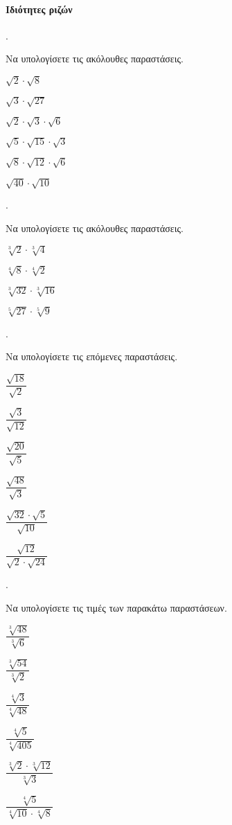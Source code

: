 \documentclass[11pt,a4paper,twocolumn]{article}
\newcounter{askhsh}
\newcommand{\askhsh}{\large\theaskhsh.\ \addtocounter{askhsh}{1}}
\begin{document}
\paragraph{Ιδιότητες ριζών}
\askhsh Να υπολογίσετε τις ακόλουθες παραστάσεις.
\begin{multicols}{2}
\begin{alist}
\item $\sqrt{2}\cdot\sqrt{8}$
\item $\sqrt{3}\cdot\sqrt{27}$
\item $\sqrt{2}\cdot\sqrt{3}\cdot\sqrt{6}$
\item $\sqrt{5}\cdot\sqrt{15}\cdot\sqrt{3}$
\item $\sqrt{8}\cdot\sqrt{12}\cdot\sqrt{6}$
\item $\sqrt{40}\cdot\sqrt{10}$
\end{alist}
\end{multicols}
\askhsh Να υπολογίσετε τις ακόλουθες παραστάσεις.
\begin{multicols}{2}
\begin{alist}
\item $\sqrt[3]{2}\cdot\sqrt[3]{4}$
\item $\sqrt[4]{8}\cdot\sqrt[4]{2}$
\item $\sqrt[3]{32}\cdot\sqrt[3]{16}$
\item $\sqrt[5]{27}\cdot\sqrt[5]{9}$
\end{alist}
\end{multicols}
\askhsh Να υπολογίσετε τις επόμενες παραστάσεις.
\begin{multicols}{3}
\begin{alist}
\item $\dfrac{\sqrt{18}}{\sqrt{2}}$
\item $\dfrac{\sqrt{3}}{\sqrt{12}}$
\item $\dfrac{\sqrt{20}}{\sqrt{5}}$
\item $\dfrac{\sqrt{48}}{\sqrt{3}}$
\item $\dfrac{\sqrt{32}\cdot\sqrt{5}}{\sqrt{10}}$
\item $\dfrac{\sqrt{12}}{\sqrt{2}\cdot\sqrt{24}}$
\end{alist}
\end{multicols}
\askhsh Να υπολογίσετε τις τιμές των παρακάτω παραστάσεων.
\begin{multicols}{3}
\begin{alist}
\item $\dfrac{\sqrt[3]{48}}{\sqrt[3]{6}}$
\item $\dfrac{\sqrt[3]{54}}{\sqrt[3]{2}}$
\item $\dfrac{\sqrt[4]{3}}{\sqrt[4]{48}}$
\item $\dfrac{\sqrt[4]{5}}{\sqrt[4]{405}}$
\item $\dfrac{\sqrt[3]{2}\cdot\sqrt[3]{12}}{\sqrt[3]{3}}$
\item $\dfrac{\sqrt[4]{5}}{\sqrt[4]{10}\cdot\sqrt[4]{8}}$
\end{alist}
\end{multicols}
\end{document}
